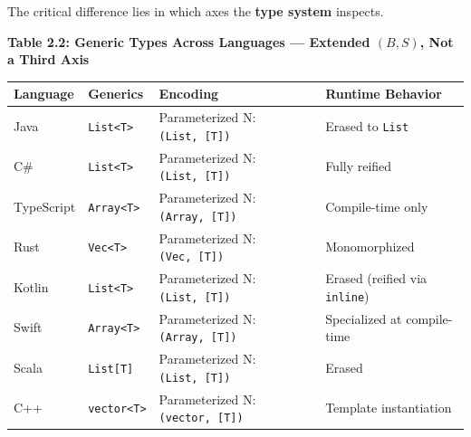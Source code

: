 The critical difference lies in which axes the \textbf{type system} inspects.

\textbf{Table 2.2: Generic Types Across Languages --- Extended $(B, S)$,
Not a Third Axis}

\small
\begin{longtable}[]{@{}
  >{\raggedright\arraybackslash}p{}
  >{\raggedright\arraybackslash}p{}
  >{\raggedright\arraybackslash}p{}
  >{\raggedright\arraybackslash}p{}@{}}
\toprule\noalign{}
\begin{minipage}[b]{\linewidth}\raggedright
Language
\end{minipage} & \begin{minipage}[b]{\linewidth}\raggedright
Generics
\end{minipage} & \begin{minipage}[b]{\linewidth}\raggedright
Encoding
\end{minipage} & \begin{minipage}[b]{\linewidth}\raggedright
Runtime Behavior
\end{minipage} \\
\midrule\noalign{}
\endhead
\bottomrule\noalign{}
\endlastfoot
Java & \texttt{List\textless{}T\textgreater{}} & Parameterized N:
\texttt{(List,\ {[}T{]})} & Erased to \texttt{List} \\
C\# & \texttt{List\textless{}T\textgreater{}} & Parameterized N:
\texttt{(List,\ {[}T{]})} & Fully reified \\
TypeScript & \texttt{Array\textless{}T\textgreater{}} & Parameterized N:
\texttt{(Array,\ {[}T{]})} & Compile-time only \\
Rust & \texttt{Vec\textless{}T\textgreater{}} & Parameterized N:
\texttt{(Vec,\ {[}T{]})} & Monomorphized \\
Kotlin & \texttt{List\textless{}T\textgreater{}} & Parameterized N:
\texttt{(List,\ {[}T{]})} & Erased (reified via \texttt{inline}) \\
Swift & \texttt{Array\textless{}T\textgreater{}} & Parameterized N:
\texttt{(Array,\ {[}T{]})} & Specialized at compile-time \\
Scala & \texttt{List{[}T{]}} & Parameterized N:
\texttt{(List,\ {[}T{]})} & Erased \\
C++ & \texttt{vector\textless{}T\textgreater{}} & Parameterized N:
\texttt{(vector,\ {[}T{]})} & Template instantiation \\
\end{longtable}


